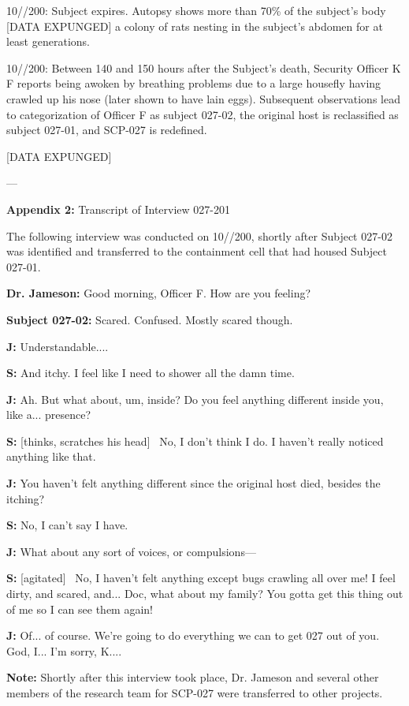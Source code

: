 10//200: Subject expires. Autopsy shows more than 70\% of the subject’s body [DATA EXPUNGED] a colony of rats nesting in the subject’s abdomen for at least  generations.

10//200: Between 140 and 150 hours after the Subject’s death, Security Officer K F reports being awoken by breathing problems due to a large housefly having crawled up his nose (later shown to have lain eggs). Subsequent observations lead to categorization of Officer F as subject 027-02, the original host is reclassified as subject 027-01, and SCP-027 is redefined.

[DATA EXPUNGED]

---

\textbf{Appendix 2:} Transcript of Interview 027-201

The following interview was conducted on 10//200, shortly after Subject 027-02 was identified and transferred to the containment cell that had housed Subject 027-01.
\begin{leftbar}
\textbf{Dr. Jameson:} Good morning, Officer F. How are you feeling?

\textbf{Subject 027-02:} Scared. Confused. Mostly scared though.

\textbf{J:} Understandable....

\textbf{S:} And itchy. I feel like I need to shower all the damn time.

\textbf{J:} Ah. But what about, um, inside? Do you feel anything different inside you, like a... presence?

\textbf{S:} [thinks, scratches his head] \ No, I don't think I do. I haven't really noticed anything like that.

\textbf{J:} You haven't felt anything different since the original host died, besides the itching?

\textbf{S:} No, I can't say I have.

\textbf{J:} What about any sort of voices, or compulsions—

\textbf{S:} [agitated] \ No, I haven't felt anything except bugs crawling all over me! I feel dirty, and scared, and... Doc, what about my family? You gotta get this thing out of me so I can see them again!

\textbf{J:} Of... of course. We're going to do everything we can to get 027 out of you. God, I... I'm sorry, K....
\end{leftbar}

\textbf{Note:} Shortly after this interview took place, Dr. Jameson and several other members of the research team for SCP-027 were transferred to other projects.